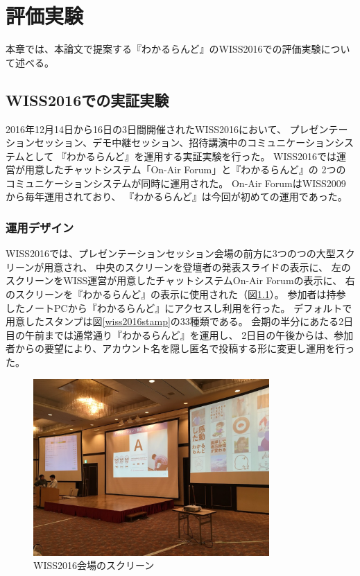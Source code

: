 \chapter{評価実験}
\label{chap:experiment}

本章では、本論文で提案する『わかるらんど』のWISS2016での評価実験について述べる。

\newpage

\section{WISS2016での実証実験}
2016年12月14日から16日の3日間開催されたWISS2016において、
プレゼンテーションセッション、デモ中継セッション、招待講演中のコミュニケーションシステムとして
『わかるらんど』を運用する実証実験を行った。
WISS2016では運営が用意したチャットシステム「On-Air Forum」と『わかるらんど』の
2つのコミュニケーションシステムが同時に運用された。
On-Air ForumはWISS2009から毎年運用されており、
『わかるらんど』は今回が初めての運用であった。

\subsection{運用デザイン}
WISS2016では、プレゼンテーションセッション会場の前方に3つのつの大型スクリーンが用意され、
中央のスクリーンを登壇者の発表スライドの表示に、
左のスクリーンをWISS運営が用意したチャットシステムOn-Air Forumの表示に、
右のスクリーンを『わかるらんど』の表示に使用された（図\ref{wiss2016}）。
参加者は持参したノートPCから『わかるらんど』にアクセスし利用を行った。
デフォルトで用意したスタンプは図\ref{wiss2016stamp}の33種類である。
会期の半分にあたる2日目の午前までは通常通り『わかるらんど』を運用し、
2日目の午後からは、参加者からの要望により、アカウント名を隠し匿名で投稿する形に変更し運用を行った。

\begin{figure}[h]
\centering
\includegraphics[width=9cm]{images/wiss2016.png}
\caption{WISS2016会場のスクリーン}
\label{wiss2016}
\end{figure}

